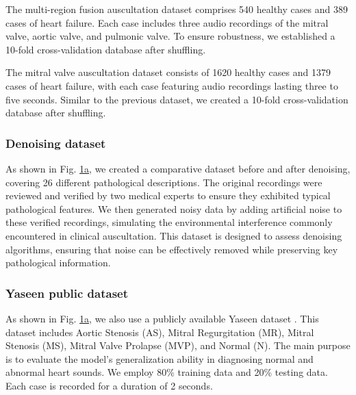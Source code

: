 The multi-region fusion auscultation dataset comprises 540 healthy cases and 389 cases of heart failure. Each case includes three audio recordings of the mitral valve, aortic valve, and pulmonic valve. To ensure robustness, we established a 10-fold cross-validation database after shuffling.

The mitral valve auscultation dataset consists of 1620 healthy cases and 1379 cases of heart failure, with each case featuring audio recordings lasting three to five seconds. Similar to the previous dataset, we created a 10-fold cross-validation database after shuffling.
\subsubsection{Denoising dataset}
As shown in Fig. \hyperref[FIG:Methodology]{1a}, we created a comparative dataset before and after denoising, covering 26 different pathological descriptions. The original recordings were reviewed and verified by two medical experts to ensure they exhibited typical pathological features. We then generated noisy data by adding artificial noise to these verified recordings, simulating the environmental interference commonly encountered in clinical auscultation. This dataset is designed to assess denoising algorithms, ensuring that noise can be effectively removed while preserving key pathological information.
\subsubsection{Yaseen public dataset}
As shown in Fig. \hyperref[FIG:Methodology]{1a}, we also use a publicly available Yaseen dataset \cite{son2018classification}. This dataset includes Aortic Stenosis (AS), Mitral Regurgitation (MR), Mitral Stenosis (MS), Mitral Valve Prolapse (MVP), and Normal (N). The main purpose is to evaluate the model's generalization ability in diagnosing normal and abnormal heart sounds. We employ 80\% training data and 20\% testing data. Each case is recorded for a duration of 2 seconds.
